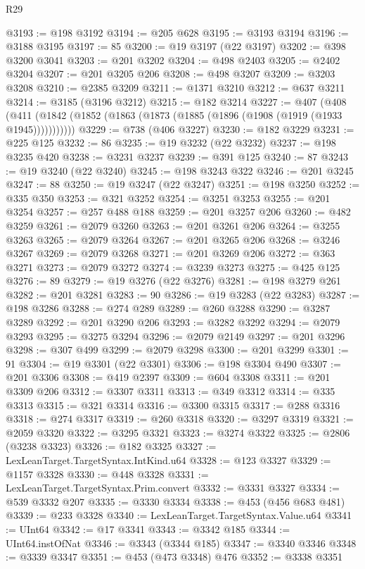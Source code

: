 \begin{lexlean}{R29}
\begin{coremodule}
@3193 := @198 @3192
@3194 := @205 @628
@3195 := @3193 @3194
@3196 := @3188 @3195
@3197 := 85
@3200 := @19 @3197 (@22 @3197)
@3202 := @398 @3200 @3041
@3203 := @201 @3202
@3204 := @498 @2403
@3205 := @2402 @3204
@3207 := @201 @3205 @206
@3208 := @498 @3207
@3209 := @3203 @3208
@3210 := @2385 @3209
@3211 := @1371 @3210
@3212 := @637 @3211
@3214 := @3185 (@3196 @3212)
@3215 := @182 @3214
@3227 := @407
    (@408 (@411 (@1842 (@1852 (@1863 (@1873 (@1885 (@1896 (@1908 (@1919 (@1933 @1945)))))))))))
@3229 := @738 (@406 @3227)
@3230 := @182 @3229
@3231 := @225 @125
@3232 := 86
@3235 := @19 @3232 (@22 @3232)
@3237 := @198 @3235 @420
@3238 := @3231 @3237
@3239 := @391 @125
@3240 := 87
@3243 := @19 @3240 (@22 @3240)
@3245 := @198 @3243 @322
@3246 := @201 @3245
@3247 := 88
@3250 := @19 @3247 (@22 @3247)
@3251 := @198 @3250
@3252 := @335 @350
@3253 := @321 @3252
@3254 := @3251 @3253
@3255 := @201 @3254
@3257 := @257 @488 @188
@3259 := @201 @3257 @206
@3260 := @482 @3259
@3261 := @2079 @3260
@3263 := @201 @3261 @206
@3264 := @3255 @3263
@3265 := @2079 @3264
@3267 := @201 @3265 @206
@3268 := @3246 @3267
@3269 := @2079 @3268
@3271 := @201 @3269 @206
@3272 := @363 @3271
@3273 := @2079 @3272
@3274 := @3239 @3273
@3275 := @425 @125
@3276 := 89
@3279 := @19 @3276 (@22 @3276)
@3281 := @198 @3279 @261
@3282 := @201 @3281
@3283 := 90
@3286 := @19 @3283 (@22 @3283)
@3287 := @198 @3286
@3288 := @274 @289
@3289 := @260 @3288
@3290 := @3287 @3289
@3292 := @201 @3290 @206
@3293 := @3282 @3292
@3294 := @2079 @3293
@3295 := @3275 @3294
@3296 := @2079 @2149
@3297 := @201 @3296
@3298 := @307 @499
@3299 := @2079 @3298
@3300 := @201 @3299
@3301 := 91
@3304 := @19 @3301 (@22 @3301)
@3306 := @198 @3304 @490
@3307 := @201 @3306
@3308 := @419 @2397
@3309 := @604 @3308
@3311 := @201 @3309 @206
@3312 := @3307 @3311
@3313 := @349 @3312
@3314 := @335 @3313
@3315 := @321 @3314
@3316 := @3300 @3315
@3317 := @288 @3316
@3318 := @274 @3317
@3319 := @260 @3318
@3320 := @3297 @3319
@3321 := @2059 @3320
@3322 := @3295 @3321
@3323 := @3274 @3322
@3325 := @2806 (@3238 @3323)
@3326 := @182 @3325
@3327 := LexLeanTarget.TargetSyntax.IntKind.u64
@3328 := @123 @3327
@3329 := @1157 @3328
@3330 := @448 @3328
@3331 := LexLeanTarget.TargetSyntax.Prim.convert
@3332 := @3331 @3327
@3334 := @539 @3332 @207
@3335 := @3330 @3334
@3338 := @453 (@456 @683 @481)
@3339 := @233 @3328
@3340 := LexLeanTarget.TargetSyntax.Value.u64
@3341 := UInt64
@3342 := @17 @3341
@3343 := @3342 @185
@3344 := UInt64.instOfNat
@3346 := @3343 (@3344 @185)
@3347 := @3340 @3346
@3348 := @3339 @3347
@3351 := @453 (@473 @3348) @476
@3352 := @3338 @3351

\end{coremodule}
\end{lexlean}
